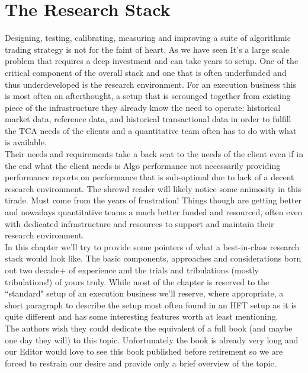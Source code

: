 
\chapter{The Research Stack}\label{chap:ch_tech_res}
Designing, testing, calibrating, measuring and improving a suite of algorithmic trading strategy is not for the faint of heart. As we have  seen It's a large scale problem that requires a deep investment and can take years to setup. One of the critical component of the overall stack and one that is often underfunded and thus underdeveloped is the research environment. For an execution business this is most often an afterthought, a setup that is scrounged together from existing piece of the infrastructure they already know the need to operate: historical market data, reference data, and historical transactional data in order to fulfill the TCA needs of the clients and a quantitative team often has to do with what is available. \\

Their needs and requirements take a back seat to the needs of the client even if in the end what the client needs is Algo performance not necessarily providing performance reports on  performance that is sub-optimal due to lack of a decent research environment. The shrewd reader will likely notice some animosity in this tirade. Must come from the years of frustration! Things though are getting better and nowadays quantitative teams a much better funded and resourced, often even with dedicated infrastructure and resources to support and maintain their research environment.\\

In this chapter we'll try to provide some pointers of what a best-in-class research stack would look like. The basic components, approaches and considerations born out two decade+  of experience and the trials and tribulations (mostly tribulations!) of yours truly. While most of the chapter is reserved to the ``standard" setup of an execution business we'll reserve, where appropriate, a short paragraph to describe the setup most often found in an HFT setup as it is quite different and has some interesting features worth at least mentioning.\\


The authors wish they could dedicate the equivalent of a full book (and maybe one day they will) to this topic. Unfortunately the book is already very long and our Editor would love to see this book published before retirement so we are forced to restrain our desire and provide only a brief overview of the topic.  

